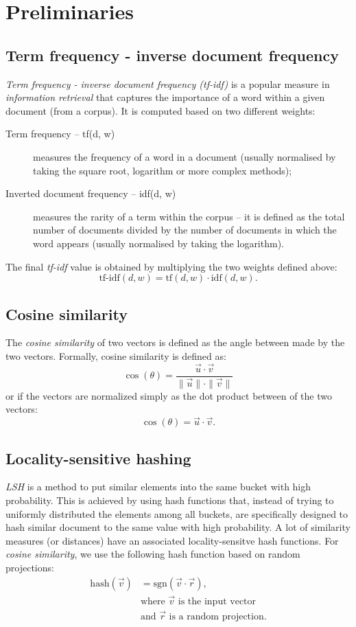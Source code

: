 \chapter{Preliminaries}

\section{Term frequency - inverse document frequency}

\emph{Term frequency - inverse document frequency (tf-idf)}
\cite{salton1988term} is a popular measure in \emph{information retrieval} that
captures the importance of a word within a given document (from a corpus).
It is computed based on two different weights:
\begin{description}
  \item[Term frequency -- tf(d, w)] measures the frequency of a word in a
  document (usually normalised by taking the square root, logarithm or more
  complex methods);
  \item[Inverted document frequency -- idf(d, w)] measures the rarity of a term
  within the corpus -- it is defined as the total number of documents divided
  by the number of documents in which the word appears (usually normalised by
  taking the logarithm).
\end{description}
The final \emph{tf-idf} value is obtained by multiplying the two weights
defined above:
\[ \text{tf-idf}(d, w) = \text{tf}(d, w) \cdot \text{idf}(d, w). \]

\section{Cosine similarity}

The \emph{cosine similarity} of two vectors is defined as the angle between
made by the two vectors.
Formally, cosine similarity is defined as:
\[\cos(\theta) = \frac{\vec{u} \cdot \vec{v}}{\|\vec{u}\| \cdot \|\vec{v}\|}\]
or if the vectors are normalized simply as the dot product between of the two
vectors:
\[\cos(\theta) = \vec{u} \cdot \vec{v}.\]

\section{Locality-sensitive hashing}

\emph{\ac{LSH}} \cite{rajaraman2012mining} is a method to put similar elements
into the same bucket with high probability. This is achieved by using hash
functions that, instead of trying to uniformly distributed the elements among
all buckets, are specifically designed to hash similar document to the same
value with high probability.
A lot of similarity measures (or distances) have an associated
locality-sensitve hash functions. For \emph{cosine similarity}, we use the
following hash function based on random projections:
\begin{align*}
  \text{hash}(\vec{v}) &= \text{sgn}(\vec{v} \cdot \vec{r}), \\
  &\text{where \(\vec{v}\) is the input vector} \\
  &\text{and \(\vec{r}\) is a random projection.}
\end{align*}

